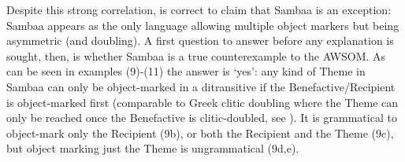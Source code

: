 \documentclass[output=paper
,modfonts
,nonflat]{langsci/langscibook}
\begin{document}
Despite this strong correlation, \citet{Riedel2009} is correct to claim that Sambaa is an exception: Sambaa appears as the only language allowing multiple object markers but being asymmetric (and doubling). A first question to answer before any explanation is sought, then, is whether Sambaa is a true counterexample to the AWSOM. As can be seen in examples (9)-(11) the answer is ‘yes’: any kind of Theme in Sambaa can only be object-marked in a ditransitive if the Benefactive/Recipient is object-marked first (comparable to Greek clitic doubling where the Theme can only be reached once the Benefactive is clitic-doubled, see \citealt{Anagnostopoulou2003, Anagnostopoulou2014}).
It is grammatical to object-mark only the Recipient (9b), or both the Recipient and the Theme (9c), but object marking just the Theme is ungrammatical (9d,e).
\end{document}
